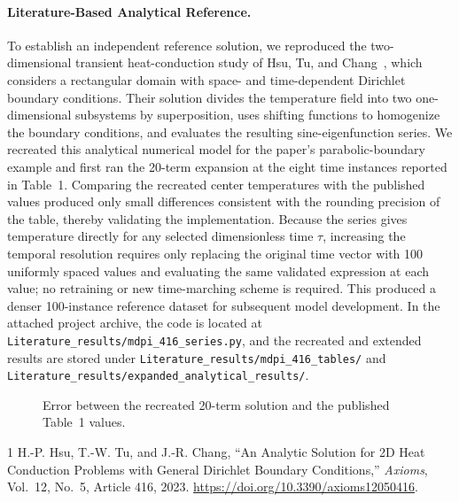 \documentclass[10pt]{article}
\begin{document}
\paragraph{Literature-Based Analytical Reference.}
To establish an independent reference solution, we reproduced the two-dimensional transient heat-conduction study of Hsu, Tu, and Chang~\cite{Hsu2023}, which considers a rectangular domain with space- and time-dependent Dirichlet boundary conditions. Their solution divides the temperature field into two one-dimensional subsystems by superposition, uses shifting functions to homogenize the boundary conditions, and evaluates the resulting sine-eigenfunction series. We recreated this analytical numerical model for the paper's parabolic-boundary example and first ran the 20-term expansion at the eight time instances reported in Table~1. Comparing the recreated center temperatures with the published values produced only small differences consistent with the rounding precision of the table, thereby validating the implementation. Because the series gives temperature directly for any selected dimensionless time $\tau$, increasing the temporal resolution requires only replacing the original time vector with 100 uniformly spaced values and evaluating the same validated expression at each value; no retraining or new time-marching scheme is required. This produced a denser 100-instance reference dataset for subsequent model development. In the attached project archive, the code is located at \texttt{Literature\_results/mdpi\_416\_series.py}, and the recreated and extended results are stored under \texttt{Literature\_results/mdpi\_416\_tables/} and \texttt{Literature\_results/expanded\_analytical\_results/}.

\begin{figure}[h]
  \centering
  \caption{Error between the recreated 20-term solution and the published Table~1 values.}
  \label{fig:table1error}
\end{figure}

\begin{thebibliography}{1}
H.-P. Hsu, T.-W. Tu, and J.-R. Chang, ``An Analytic Solution for 2D Heat Conduction Problems with General Dirichlet Boundary Conditions,'' \emph{Axioms}, Vol.~12, No.~5, Article 416, 2023. \url{https://doi.org/10.3390/axioms12050416}.
\end{thebibliography}
\end{document}
